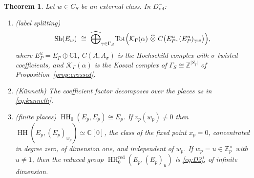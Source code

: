 \documentclass[11pt]{amsart}
\newtheorem{theorem}{Theorem}[section]
\theoremstyle{definition}
\theoremstyle{remark}
\newcommand{\C}{\mathbb C}
\newcommand{\Z}{\mathbb Z}
\newcommand{\HH}{\operatorname{HH}}
\newcommand{\Sh}{\operatorname{Sh}}
\begin{document}
\begin{theorem}\label{thm:shadow}
Let $w\in C_S$ be an external class.  In $D^{-}_{\mathrm{rel}}$:
\begin{enumerate}
\item[(a)] \emph{(label splitting)}
\begin{equation}\label{eq:labelsplit}
\Sh(E_w)\ \cong\ \widehat\bigoplus_{\gamma\in\Gamma_S}
\mathrm{Tot}\Bigl(\mathcal K_{\Gamma}(\alpha)\ \widehat\otimes\
C\bigl(E_P^{u},(E_P^{u})_{\gamma w}\bigr)\Bigr),
\end{equation}
where $E_P^{u}=E_P\oplus\C1$, $C(A,A_{\sigma})$ is the Hochschild
complex with $\sigma$-twisted coefficients, and $\mathcal K_{\Gamma}(\alpha)$
is the Koszul complex of $\Gamma_S\cong\Z^{|S_f|}$ of
Proposition~\ref{prop:crossed}.
\item[(b)] \emph{(K\"unneth)}  The
coefficient factor decomposes over the places as in \eqref{eq:kunneth}.
\item[(c)] \emph{(finite places)}  $\HH_0(E_p,E_p)\cong E_p$.  If
$v_p(w_p)\ne0$ then $\HH(E_p,(E_p)_{w_p})\simeq\C[0]$, the class of the fixed
point $x_p=0$, concentrated in degree zero, of dimension one, and
\emph{independent of $w_p$}.  If $w_p=u\in\Z_p^{\times}$ with $u\ne1$, then
the reduced group $\HH_0^{\mathrm{red}}(E_p,(E_p)_u)$ is \eqref{eq:D2}, of
infinite dimension.
\end{enumerate}
\end{theorem}
\end{document}
